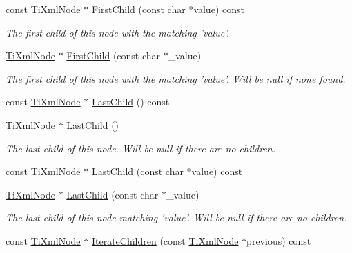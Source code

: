 \begin{DoxyCompactItemize}
\item 
const \hyperlink{classTiXmlNode}{TiXmlNode} $\ast$ \hyperlink{classTiXmlNode_ab5f722624113c8203227de4f56576d31}{FirstChild} (const char $\ast$\hyperlink{classTiXmlNode_aead528b3cedc33c16a6c539872c7cc8b}{value}) const 
\begin{DoxyCompactList}\small\item\em The first child of this node with the matching 'value'. \item\end{DoxyCompactList}\item 
\hyperlink{classTiXmlNode}{TiXmlNode} $\ast$ \hyperlink{classTiXmlNode_abc8bf32be6419ec453a731868de19554}{FirstChild} (const char $\ast$\_\-value)
\begin{DoxyCompactList}\small\item\em The first child of this node with the matching 'value'. Will be null if none found. \item\end{DoxyCompactList}\item 
const \hyperlink{classTiXmlNode}{TiXmlNode} $\ast$ \hyperlink{classTiXmlNode_a6d671107e00cca1d28cb2d7f3a87a21e}{LastChild} () const 
\item 
\hyperlink{classTiXmlNode}{TiXmlNode} $\ast$ \hyperlink{classTiXmlNode_a6432d2b2495f6caf9cb4278df706a031}{LastChild} ()
\begin{DoxyCompactList}\small\item\em The last child of this node. Will be null if there are no children. \item\end{DoxyCompactList}\item 
const \hyperlink{classTiXmlNode}{TiXmlNode} $\ast$ \hyperlink{classTiXmlNode_acdd3fdc436aa7433023310a041e5e63f}{LastChild} (const char $\ast$\hyperlink{classTiXmlNode_aead528b3cedc33c16a6c539872c7cc8b}{value}) const 
\item 
\hyperlink{classTiXmlNode}{TiXmlNode} $\ast$ \hyperlink{classTiXmlNode_abad5bf1059c48127b958711ef89e8e5d}{LastChild} (const char $\ast$\_\-value)
\begin{DoxyCompactList}\small\item\em The last child of this node matching 'value'. Will be null if there are no children. \item\end{DoxyCompactList}\item 
const \hyperlink{classTiXmlNode}{TiXmlNode} $\ast$ \hyperlink{classTiXmlNode_aaef7ac3978c4bb1cc8a24ffae7bced75}{IterateChildren} (const \hyperlink{classTiXmlNode}{TiXmlNode} $\ast$previous) const 

\end{DoxyCompactItemize}
